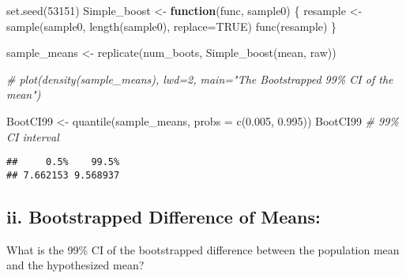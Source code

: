 \documentclass[
]{article}
\newenvironment{Shaded}{\begin{snugshade}}{\end{snugshade}}
\newcommand{\AttributeTok}[1]{\textcolor[rgb]{0.77,0.63,0.00}{#1}}
\newcommand{\CommentTok}[1]{\textcolor[rgb]{0.56,0.35,0.01}{\textit{#1}}}
\newcommand{\ConstantTok}[1]{\textcolor[rgb]{0.00,0.00,0.00}{#1}}
\newcommand{\ControlFlowTok}[1]{\textcolor[rgb]{0.13,0.29,0.53}{\textbf{#1}}}
\newcommand{\DecValTok}[1]{\textcolor[rgb]{0.00,0.00,0.81}{#1}}
\newcommand{\FloatTok}[1]{\textcolor[rgb]{0.00,0.00,0.81}{#1}}
\newcommand{\FunctionTok}[1]{\textcolor[rgb]{0.00,0.00,0.00}{#1}}
\newcommand{\NormalTok}[1]{#1}
\newcommand{\OtherTok}[1]{\textcolor[rgb]{0.56,0.35,0.01}{#1}}
\begin{document}
\begin{Shaded}
\begin{Highlighting}[]
\FunctionTok{set.seed}\NormalTok{(}\DecValTok{53151}\NormalTok{)}
\NormalTok{Simple\_boost }\OtherTok{\textless{}{-}} \ControlFlowTok{function}\NormalTok{(func, sample0) \{}
\NormalTok{  resample }\OtherTok{\textless{}{-}} \FunctionTok{sample}\NormalTok{(sample0, }\FunctionTok{length}\NormalTok{(sample0), }\AttributeTok{replace=}\ConstantTok{TRUE}\NormalTok{)}
  \FunctionTok{func}\NormalTok{(resample) }
\NormalTok{  \}}

\NormalTok{sample\_means }\OtherTok{\textless{}{-}} \FunctionTok{replicate}\NormalTok{(num\_boots, }\FunctionTok{Simple\_boost}\NormalTok{(mean, raw)) }

\CommentTok{\# plot(density(sample\_means), lwd=2, main="The Bootstrapped 99\% CI of the mean") }

\NormalTok{BootCI99 }\OtherTok{\textless{}{-}} \FunctionTok{quantile}\NormalTok{(sample\_means, }\AttributeTok{probs =} \FunctionTok{c}\NormalTok{(}\FloatTok{0.005}\NormalTok{, }\FloatTok{0.995}\NormalTok{))}
\NormalTok{BootCI99 }\CommentTok{\# 99\% CI interval}
\end{Highlighting}
\end{Shaded}

\begin{verbatim}
##     0.5%    99.5% 
## 7.662153 9.568937
\end{verbatim}

\hypertarget{ii.-bootstrapped-difference-of-means}{%
\subsection{ii. Bootstrapped Difference of
Means:}\label{ii.-bootstrapped-difference-of-means}}

What is the 99\% CI of the bootstrapped difference between the
population mean and the hypothesized mean?
\end{document}
